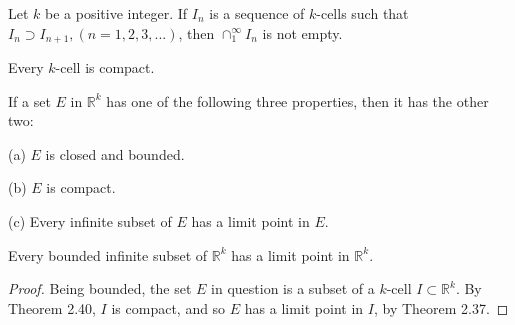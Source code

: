 \begin{thm}\label{thm:2.39}
    Let $k$ be a positive integer. If ${I_n}$ is a sequence of $k$-cells such that $I_n \supset I_{n+1}, (n=1,2,3,...)$, then $\cap_1^\infty I_n$ is not empty.
\end{thm}

\begin{thm}\label{thm:2.40}
    Every $k$-cell is compact.
\end{thm}

\begin{thm}\label{thm:2.41}
    If a set $E$ in $\mathbb{R}^k$ has one of the following three properties, then it has the other two:

(a) $E$ is closed and bounded.

(b) $E$ is compact.

(c) Every infinite subset of $E$ has a limit point in $E$.
\end{thm}

\begin{thm}\label{thm:2.42 Weierstrass}
    Every bounded infinite subset of $\mathbb{R}^k$ has a limit point in $\mathbb{R}^k$.
\end{thm}

\begin{proof}
    Being bounded, the set $E$ in question is a subset of a $k$-cell $I\subset \mathbb{R}^k$.
    By Theorem 2.40, $I$ is compact, 
    and so $E$ has a limit point in $I$, by Theorem 2.37.
\end{proof}
